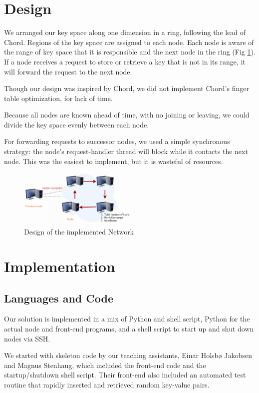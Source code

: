 \documentclass[11pt,conference]{IEEEtran}
\begin{document}
\section{Design}

We arranged our key space along one dimension in a ring, following the lead of
Chord\cite{chord}. Regions of the key space are assigned to each node. Each node
is aware of the range of key space that it is responsible and the next node in
the ring (Fig \ref{fig:design}). If a node receives a request to store or retrieve a key that is not in
its range, it will forward the request to the next node.

Though our design was inspired by Chord, we did not implement Chord's finger
table optimization, for lack of time.

Because all nodes are known ahead of time, with no joining or leaving, we could
divide the key space evenly between each node.

For forwarding requests to successor nodes, we used a simple synchronous
strategy: the node's request-handler thread will block while it contacts the
next node. This was the easiest to implement, but it is wasteful of resources.

\begin{figure}[h!]
  \centering
    \includegraphics[width=0.5\textwidth]{design}
    \caption{Design of the implemented Network}
    \label{fig:design}
\end{figure}


\section{Implementation}


\subsection{Languages and Code}

Our solution is implemented in a mix of Python and shell script, Python for the
actual node and front-end programs, and a shell script to start up and shut down
nodes via SSH.

We started with skeleton code by our teaching assistants, Einar Holsbø Jakobsen
and Magnus Stenhaug, which included the front-end code and the startup/shutdown
shell script. Their front-end also included an automated test routine that
rapidly inserted and retrieved random key-value pairs.
\end{document}
